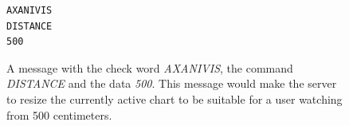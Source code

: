\documentclass[12pt,a4paper,notitlepage]{report}
\begin{document}


\begin{figure}[h]
  \lstset{%
    basicstyle=\ttfamily\bfseries,
    xleftmargin=.4\textwidth, xrightmargin=.2\textwidth
  }
\begin{lstlisting}
AXANIVIS
DISTANCE
500
\end{lstlisting}
\caption{A message with the check word \textit{AXANIVIS}, the command \mbox{\textit{DISTANCE}} and the data \textit{500}. This message would make the server to resize the currently active chart to be suitable for a user watching from 500 centimeters. \label{fig:example_message}}
\end{figure}







\end{document}
